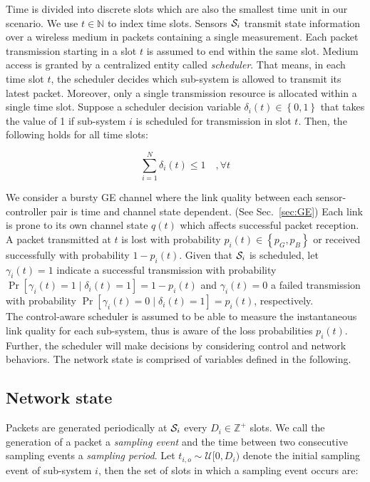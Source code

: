 Time is divided into discrete slots which are also the smallest time unit in our
scenario. We use $t \in \mathbb{N}$ to index time slots. Sensors $\mathcal{S}_i$
transmit state information over a wireless medium in packets containing a single
measurement. Each packet transmission starting in a slot $t$ is assumed to end
within the same slot. Medium access is granted by a centralized entity called
\textit{scheduler}. That means, in each time slot $t$, the scheduler decides
which sub-system is allowed to transmit its latest packet. Moreover, only a
single transmission resource is allocated within a single time slot. Suppose a
scheduler decision variable $\delta_i(t) \in \left\{0,1\right\}$ that takes the
value of 1 if sub-system $i$ is scheduled for transmission in slot $t$. Then,
the following holds for all time slots:

\begin{equation}
  \sum_{i=1}^{N}{\delta_i(t) \leq 1 \quad, \forall t}
\end{equation}

We consider a bursty GE channel where the link quality between each
sensor-controller pair is time and channel state dependent. (See
Sec.~{\ref{sec:GE}}) Each link is prone to its own channel state $q(t)$ which
affects successful packet reception. A packet transmitted at $t$ is lost with
probability $p_i(t) \in \left\{p_G,p_B\right\}$ or received successfully with
probability $1-p_i(t)$. Given that $\mathcal{S}_i$ is scheduled, let $\gamma_i(t)=1$
indicate a successful transmission with probability $\Pr[\gamma_i(t)=1 \mid
\delta_i(t)=1] = 1-p_i(t)$ and $\gamma_i(t)=0$ a failed transmission with
probability $\Pr[\gamma_i(t)=0 \mid \delta_i(t)=1] = p_i(t)$, respectively. \\ 
The control-aware scheduler is assumed to be able to measure the instantaneous
link quality for each sub-system, thus is aware of the loss probabilities
$p_i(t)$. Further, the scheduler will make decisions by considering control and
network behaviors. The network state is comprised of variables defined in the
following.

\subsection{Network state}

Packets are generated periodically at $\mathcal{S}_i$ every $D_i \in \mathbb{Z}^+$
slots. We call the generation of a packet a \textit{sampling event} and the time
between two consecutive sampling events a \textit{sampling period}. Let $t_{i,o}
\sim \mathcal{U}[0, D_i)$ denote the initial sampling event of sub-system $i$,
then the set of slots in which a sampling event occurs are:

